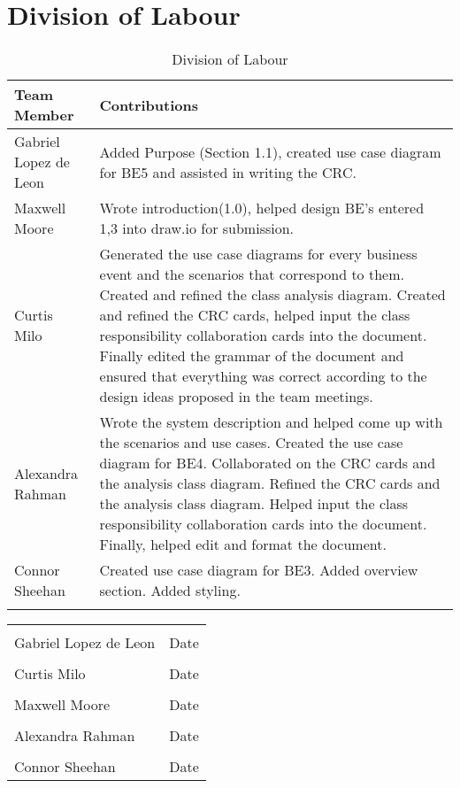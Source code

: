 \documentclass[titlepage]{article}
\begin{document}
\section{Division of Labour}
\label{sec:division_of_labour}
\begin{longtable}{| p{} | p{} |}
			\hline
			\textbf {Team Member} & \textbf{Contributions}\\ 
			\hline
			Gabriel Lopez de Leon &  Added Purpose (Section 1.1), created use case diagram for BE5 and assisted in writing the CRC.
			\\
			\hline
			Maxwell Moore & Wrote introduction(1.0), helped design BE's entered 1,3 into draw.io for submission.
			\\
			\hline
			Curtis Milo & Generated the use case diagrams for every business event and the scenarios that correspond to them. Created and refined the class analysis diagram. Created and refined the CRC cards, helped input the class responsibility collaboration cards into the document. Finally edited the grammar of the document and ensured that everything was correct according to the design ideas proposed in the team meetings.
			\\ 
			\hline
			Alexandra Rahman & Wrote the system description and helped come up with the scenarios and use cases. Created the use case diagram for BE4. Collaborated on the CRC cards and the analysis class diagram. Refined the CRC cards and the analysis class diagram. Helped input the class responsibility collaboration cards into the document. Finally, helped edit and format the document.
			\\
			\hline
			Connor Sheehan & Created use case diagram for BE3. Added overview section. Added styling.\\
			\hline
			
			\caption{Division of Labour}
		\end{longtable}



\noindent\begin{tabular}{ll}\\
	\makebox[2.5in]{\hrulefill} & \makebox[2.5in]			{\hrulefill}\\
	Gabriel Lopez de Leon & Date\\[8ex]%
	\makebox[2.5in]{\hrulefill} & \makebox[2.5in]			{\hrulefill}\\
	Curtis Milo & Date\\[8ex]
	\makebox[2.5in]{\hrulefill} & \makebox[2.5in]			{\hrulefill}\\
	Maxwell Moore & Date\\[8ex]
	\makebox[2.5in]{\hrulefill} & \makebox[2.5in]			{\hrulefill}\\
	Alexandra Rahman & Date\\[8ex]
	\makebox[2.5in]{\hrulefill} & \makebox[2.5in]			{\hrulefill}\\
	Connor Sheehan & Date\\
	\end{tabular}
\end{document}
